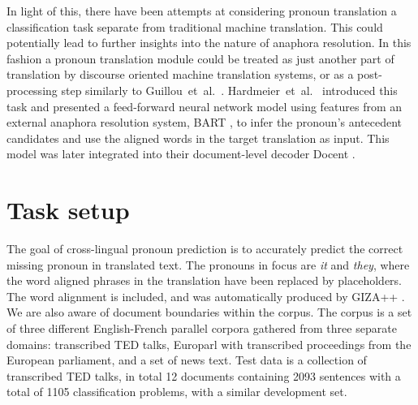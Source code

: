 \documentclass[11pt]{article}
\begin{document}
In light of this, there have been attempts at considering pronoun translation a classification task separate from traditional machine translation.
This could potentially lead to further insights into the nature of anaphora resolution.
In this fashion a pronoun translation module could be treated as just another part of translation by discourse oriented machine translation systems, or as a post-processing step similarly to Guillou~et~al.~.
Hardmeier~et~al.~ introduced this task and presented a feed-forward neural network model using features from an external anaphora resolution system, BART \cite{Broscheit2010Bart}, to infer the pronoun's antecedent candidates and use the aligned words in the target translation as input. This model was later integrated into their document-level decoder Docent \cite[chapter~9]{Hardmeier2013Docent,Hardmeier2014Discourse}.

\section{Task setup}

The goal of cross-lingual pronoun prediction is to accurately predict the correct missing pronoun in translated text.
The pronouns in focus are \emph{it} and \emph{they}, where the word aligned phrases in the translation have been replaced by placeholders.
The word alignment is included, and was automatically produced by GIZA++ \cite{Och2003Giza}.
We are also aware of document boundaries within the corpus.
The corpus is a set of three different English-French parallel corpora gathered from three separate domains:
transcribed TED talks, Europarl \cite{Koehn2005Europarl} with transcribed proceedings from the European parliament, and a set of news text.
Test data is a collection of transcribed TED talks, in total 12 documents containing 2093 sentences with a total of 1105 classification problems, with a similar development set.
\end{document}
